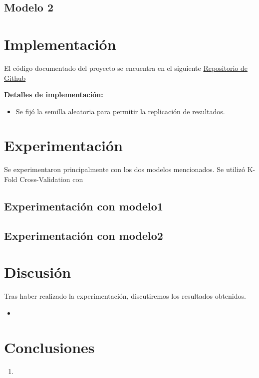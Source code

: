 \documentclass[conference]{IEEEtran}
\begin{document}
\subsection{Modelo 2}


\section{Implementación}
El código documentado del proyecto se encuentra en el siguiente 
\href{https://github.com/slamgLuke/HAClustering}{Repositorio de Github}

\noindent \textbf{Detalles de implementación:}
\begin{itemize}
\item Se fijó la semilla aleatoria para permitir la replicación de resultados.
\end{itemize}


\section{Experimentación}
Se experimentaron principalmente con los dos modelos mencionados. Se utilizó K-Fold Cross-Validation con

\subsection{Experimentación con modelo1}
\subsection{Experimentación con modelo2}

\section{Discusión}
Tras haber realizado la experimentación, discutiremos los resultados obtenidos.

\begin{itemize}
\item 
\end{itemize}

\section{Conclusiones}

\begin{enumerate}
\item 
\end{enumerate}
\end{document}
